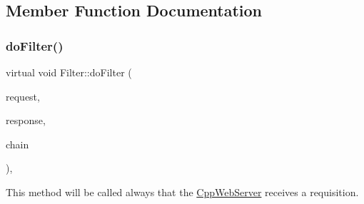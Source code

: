 \subsection{Member Function Documentation}
\mbox{\label{class_filter_a7648d16d5bc8cc5c95c072f34e507f7f}} 
\subsubsection{\texorpdfstring{do\+Filter()}{doFilter()}}
{\footnotesize\ttfamily virtual void Filter\+::do\+Filter (\begin{DoxyParamCaption}\item[{C\+W\+F\+::\+Request \&}]{request,  }\item[{C\+W\+F\+::\+Response \&}]{response,  }\item[{\hyperlink{class_filter_chain}{Filter\+Chain} \&}]{chain }\end{DoxyParamCaption})\hspace{0.3cm}{\ttfamily [inline]}, {\ttfamily [virtual]}}



This method will be called always that the \hyperlink{class_cpp_web_server}{Cpp\+Web\+Server} receives a requisition. 


